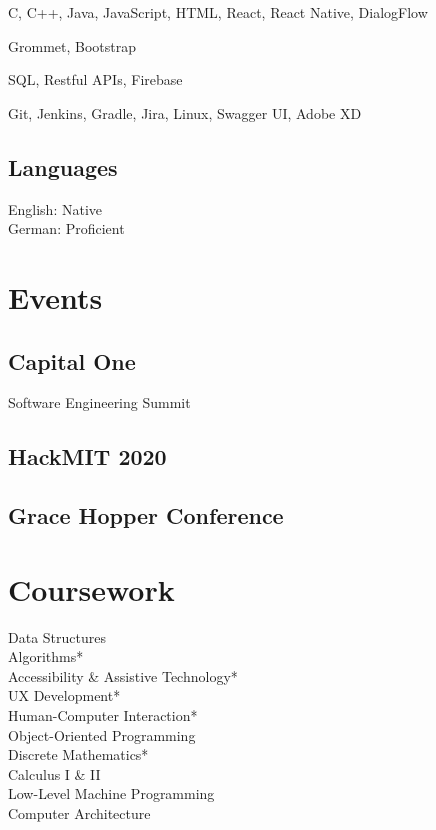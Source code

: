 \documentclass[]{hieudo-build}
\begin{document}
\begin{minipage}[t]{0.33\textwidth}
C, C++, Java, JavaScript, HTML, React, React Native, DialogFlow\\ 
\smallsectionsep

Grommet, Bootstrap \\
\smallsectionsep

SQL, Restful APIs, Firebase \\
\smallsectionsep

Git, Jenkins, Gradle, Jira, Linux, Swagger UI, Adobe XD\\
\sectionsep

\subsection{Languages}
\smallsectionsep
English: Native \\
German: Proficient \\
\sectionsep

\section{Events}
\subsection{Capital One} 
Software Engineering Summit \\
\smallsectionsep
\subsection{HackMIT 2020}
\smallsectionsep
\subsection{Grace Hopper Conference}
\sectionsep


\section{Coursework}
Data Structures \\
Algorithms* \\
Accessibility \& Assistive Technology* \\
UX Development* \\
Human-Computer Interaction* \\
Object-Oriented Programming \\
Discrete Mathematics* \\
Calculus I \& II \\
Low-Level Machine Programming \\
Computer Architecture \\
\smallsectionsep
{}
\sectionsep


\end{minipage}
\end{document}
